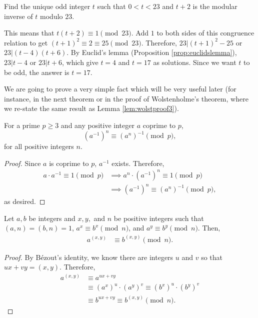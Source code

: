 \documentclass{subfile}
\begin{document}
	
	\begin{problem}
		Find the unique odd integer $t$ such that $0<t<23$ and $t+2$ is the modular inverse of $t$ modulo $23$.
	\end{problem}
	
	\begin{solution}
		This means that $t(t+2)\equiv 1 \pmod{23}$. Add $1$ to both sides of this congruence relation to get $(t+1)^2 \equiv 2 \equiv 25\pmod{23}$. Therefore, $23|(t+1)^2-25$ or $23|(t-4)(t+6)$. By Euclid's lemma (Proposition \ref{prop:euclidslemma}), $23|t-4$ or $23|t+6$, which give $t=4$ and $t=17$ as solutions. Since we want $t$ to be odd, the answer is $t=17$.
	\end{solution}

We are going to prove a very simple fact which will be very useful later (for instance, in the next theorem or in the proof of Wolstenholme's theorem, where we re-state the same result as Lemma \ref{lem:wolstproof3}).

	\begin{proposition}\label{prop:inversepower}
		For a prime $p\geq 3$ and any positive integer $a$ coprime to $p$,
		\[ (a^{-1})^n \equiv (a^n)^{-1} \pmod p,\]
		for all positive integers $n$.
	\end{proposition}

	\begin{proof}
		Since $a$ is coprime to $p$, $a^{-1}$ exists. Therefore,
			\begin{align*}
				a \cdot a^{-1} \equiv 1 \pmod p &\implies a^n \cdot (a^{-1})^n \equiv 1 \pmod p\\
				&\implies (a^{-1})^n \equiv (a^n)^{-1} \pmod p,
			\end{align*}
		as desired.
	\end{proof}

	

	\begin{theorem}\label{thm:modgcd}
	Let $a,b$ be integers and $x,y,$ and $n$ be positive integers such that $(a,n)=(b,n)=1$,  $a^x\equiv b^x\pmod n$, and $a^y\equiv b^y\pmod n$. Then,
	\begin{align*}
		a^{(x,y)} & \equiv b^{(x,y)}\pmod n.
	\end{align*}
\end{theorem}

\begin{proof}
	By B\'{e}zout's identity, we know there are integers $u$ and $v$ so that $ux+vy=(x,y)$. Therefore,
	\begin{align}
		a^{(x,y)} &\equiv a^{ux+vy}\nonumber\\
		&\equiv \left(a^x\right)^u \cdot \left(a^y\right)^v \equiv \left(b^x\right)^u \cdot \left(b^y\right)^v\label{eq:modgcd}\\
		&\equiv b^{ux+vy} \equiv b^{(x,y)} \pmod n.\nonumber
	\end{align}
\end{proof}
\end{document}
